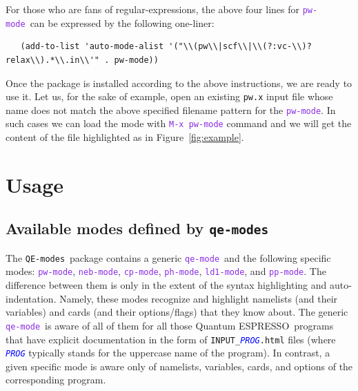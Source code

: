 \documentclass[12pt,a4paper]{article}
\def\qe{{\sc Quantum ESPRESSO}}
\def\QEmodes{\texttt{QE-modes}}
\def\qemodes{\texttt{qe-modes}}
\def\efn#1{\textcolor{BlueViolet}{\texttt{#1}}}
\def\var#1{\textcolor{Blue}{\texttt{\textit{#1}}}}
\def\qemode{\efn{qe-mode}}
\def\nebmode{\efn{neb-mode}}
\def\pwmode{\efn{pw-mode}}
\def\cpmode{\efn{cp-mode}}
\def\phmode{\efn{ph-mode}}
\def\ldmode{\efn{ld1-mode}}
\def\ppmode{\efn{pp-mode}}
\begin{document}
For those who are fans of regular-expressions, the above four lines
for \pwmode\ can be expressed by the following one-liner:

{\footnotesize
  \begin{verbatim}
   (add-to-list 'auto-mode-alist '("\\(pw\\|scf\\|\\(?:vc-\\)?relax\\).*\\.in\\'" . pw-mode))
\end{verbatim}
}

Once the package is installed according to the above instructions, we
are ready to use it. Let us, for the sake of example, open an existing
\texttt{pw.x} input file whose name does not match the above specified
filename pattern for the \pwmode. In such cases we can load the mode
with \efn{M-x pw-mode} command and we will get the content of the file
highlighted as in Figure~\ref{fig:example}.

\section{Usage}

\subsection{Available modes defined by \qemodes}

The \QEmodes\ package contains a generic \qemode\ and the following
specific modes: \pwmode, \nebmode, \cpmode, \phmode, \ldmode, and \ppmode.
The difference between them is only in the extent of the syntax
highlighting and auto-indentation. Namely, these modes recognize and
highlight namelists (and their variables) and cards (and their
options/flags) that they know about.
%
The generic \qemode\ is aware of all of them for all those \qe\
programs that have explicit documentation in the form of
\verb+INPUT_+\var{PROG}\verb+.html+ files (where \var{PROG}
typically stands for the uppercase name of the program). In contrast,
a given specific mode is aware only of namelists, variables, cards, and
options of the corresponding program.
\end{document}
